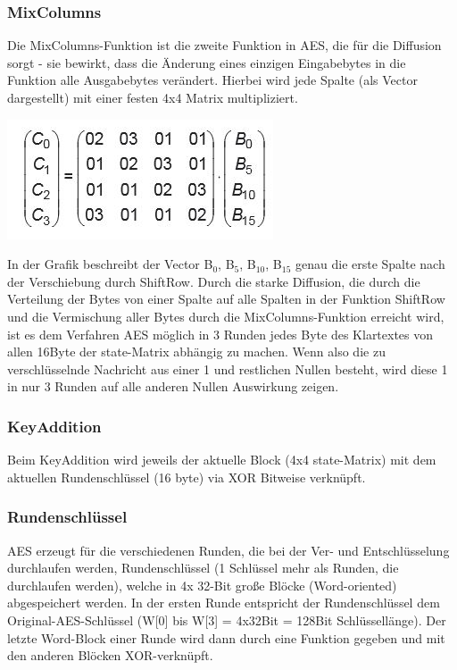\documentclass[10pt, a4paper,headsepline,pointednumbers]{scrreprt}
\begin{document}
\subsubsection{MixColumns}
Die MixColumns-Funktion ist die zweite Funktion in AES, die für die Diffusion sorgt - sie bewirkt, dass die Änderung eines einzigen Eingabebytes in die Funktion alle Ausgabebytes verändert. Hierbei wird jede Spalte (als Vector dargestellt) mit einer festen 4x4 Matrix multipliziert. 

\includegraphics[scale=0.5]{aes_mixcol.JPG}
\hfill

In der Grafik beschreibt der Vector B$_{0}$, B$_{5}$, B$_{10}$, B$_{15}$ genau die erste Spalte nach der Verschiebung durch ShiftRow. 
Durch die starke Diffusion, die durch die Verteilung der Bytes von einer Spalte auf alle Spalten in der Funktion ShiftRow und die Vermischung aller Bytes durch die MixColumns-Funktion erreicht wird, ist es dem Verfahren AES möglich in 3 Runden jedes Byte des Klartextes von allen 16Byte der state-Matrix abhängig zu machen. Wenn also die zu verschlüsselnde Nachricht aus einer 1 und restlichen Nullen besteht, wird diese 1 in nur 3 Runden auf alle anderen Nullen Auswirkung zeigen.


\subsubsection{KeyAddition}
Beim KeyAddition wird jeweils der aktuelle Block (4x4 state-Matrix) mit dem aktuellen Rundenschlüssel (16 byte) via XOR Bitweise verknüpft. 

\subsubsection{Rundenschlüssel}
AES erzeugt für die verschiedenen Runden, die bei der Ver- und Entschlüsselung durchlaufen werden, Rundenschlüssel (1 Schlüssel mehr als Runden, die durchlaufen werden), welche in 4x 32-Bit große Blöcke (Word-oriented) abgespeichert werden. In der ersten Runde entspricht der Rundenschlüssel dem Original-AES-Schlüssel (W[0] bis W[3] = 4x32Bit = 128Bit Schlüssellänge). Der letzte Word-Block einer Runde wird dann durch eine Funktion gegeben und mit den anderen Blöcken XOR-verknüpft. 
\end{document}

